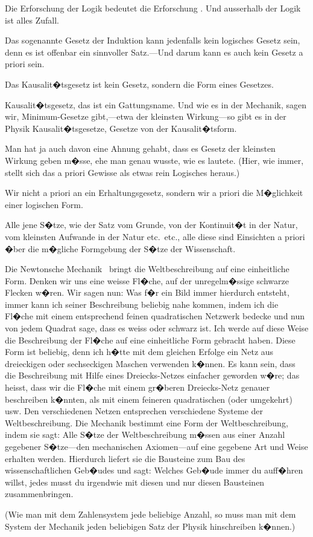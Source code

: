 {Die Erforschung der Logik bedeutet die Erforschung
. Und ausserhalb
der Logik ist alles Zufall.}


{Das sogenannte Gesetz der Induktion kann
jedenfalls kein logisches Gesetz sein, denn es ist
offenbar ein sinnvoller Satz.---Und darum kann es
auch kein Gesetz a priori sein.}


{Das Kausalit�tsgesetz ist kein Gesetz, sondern
die Form eines Gesetzes.}


{\glqq{}Kausalit�tsgesetz\grqq{}, das ist ein Gattungsname.
Und wie es in der Mechanik, sagen wir, Minimum-Gesetze
gibt,---etwa der kleinsten Wir\-kung---so
gibt es in der Physik Kausalit�tsgesetze, Gesetze
von der Kausalit�tsform.}


{Man hat ja auch davon eine Ahnung gehabt, dass
es  \glqq{}Gesetz der kleinsten Wirkung\grqq{} geben m�sse,
ehe man genau wuss\-te, wie es lautete. (Hier, wie
immer, stellt sich das a priori Gewisse als etwas
rein Logisches heraus.)}


{Wir  nicht a priori an ein Erhaltungsgesetz,
sondern wir  a priori die
M�glichkeit einer logischen Form.}


{Alle jene S�tze, wie der Satz vom Grunde, von
der Kontinuit�t in der Natur, vom kleinsten Aufwande
in der Natur etc.\ etc., alle diese sind Einsichten
a priori �ber die m�gliche Formgebung der
S�tze der Wissenschaft.}


{Die Newtonsche Mechanik \zumBeispiel\ bringt die Weltbeschreibung
auf eine einheitliche Form. Denken
wir uns eine weisse Fl�che, auf der unregelm�ssige
schwarze Flecken w�ren. Wir sagen nun: Was f�r
ein Bild immer hierdurch entsteht, immer kann ich
seiner Beschreibung beliebig nahe kommen, indem
ich die Fl�che mit einem entsprechend feinen quadratischen
Netzwerk bedecke und nun von jedem
Quadrat sage, dass es weiss oder schwarz ist. Ich
werde auf diese Weise die Beschreibung der Fl�che
auf eine einheitliche Form gebracht haben. Diese
Form ist beliebig, denn ich h�tte mit dem gleichen
Erfolge ein Netz aus dreieckigen oder sechseckigen
Maschen verwenden k�nnen. Es kann sein, dass
die Beschreibung mit Hilfe eines Dreiecks-Netzes
einfacher geworden w�re; das heisst, dass wir die
Fl�che mit einem gr�beren Dreiecks-Netz genauer
beschreiben k�nnten, als mit einem feineren quadratischen
(oder umgekehrt) usw. Den verschiedenen
Netzen entsprechen verschiedene Systeme der
Weltbeschreibung. Die Mechanik bestimmt eine
Form der Weltbeschreibung, indem sie sagt:
Alle S�tze der Weltbeschreibung m�ssen aus einer
Anzahl gegebener S�tze---den mechanischen Axiomen---auf
eine gegebene Art und Weise erhalten
werden. Hierdurch liefert sie die Bausteine zum
Bau des wissenschaftlichen Geb�udes und sagt:
Welches Geb�ude immer du auff�hren willst, jedes
musst du irgendwie mit diesen und nur diesen
Bausteinen zusammenbringen.

(Wie man mit dem Zahlensystem jede beliebige
Anzahl, so muss man mit dem System der
Mechanik jeden beliebigen Satz der Physik
hinschreiben k�nnen.)}


